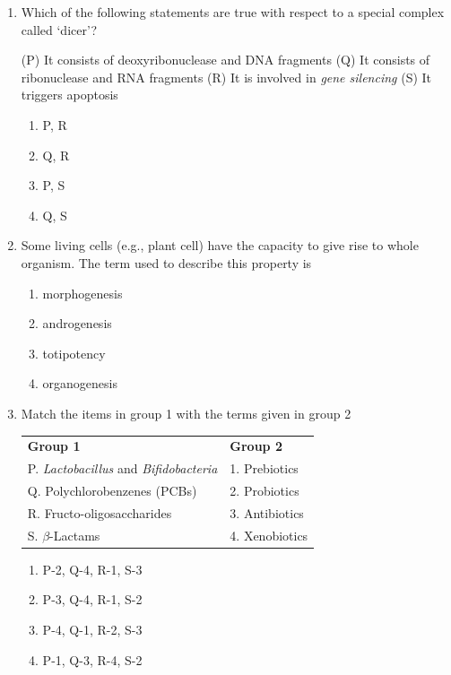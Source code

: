 \documentclass[journal,12pt,onecolumn]{IEEEtran}
\begin{document}
\begin{enumerate}
\item Which of the following statements are true with respect to a special complex called ‘dicer’?

(P) It consists of deoxyribonuclease and DNA fragments  
(Q) It consists of ribonuclease and RNA fragments  
(R) It is involved in \textit{gene silencing}  
(S) It triggers apoptosis  

\begin{multicols}{2}
\begin{enumerate}[label=(\Alph*)]
    \item P, R
    \item Q, R
    \item P, S
    \item Q, S
\end{enumerate}
\end{multicols}

\item Some living cells (e.g., plant cell) have the capacity to give rise to whole organism. The term used to describe this property is
\begin{multicols}{2}
\begin{enumerate}[label=(\Alph*)]
    \item morphogenesis
    \item androgenesis
    \item totipotency
    \item organogenesis
\end{enumerate}
\end{multicols}
\item Match the items in group 1 with the terms given in group 2

\begin{center}
\begin{tabular}{ll}
\textbf{Group 1} & \textbf{Group 2} \\
P. \textit{Lactobacillus} and \textit{Bifidobacteria} & 1. Prebiotics \\
Q. Polychlorobenzenes (PCBs) & 2. Probiotics \\
R. Fructo-oligosaccharides & 3. Antibiotics \\
S. $\beta$-Lactams & 4. Xenobiotics \\
\end{tabular}
\end{center}

\begin{multicols}{2}
\begin{enumerate}[label=(\Alph*)]
    \item P-2, Q-4, R-1, S-3
    \item P-3, Q-4, R-1, S-2
    \item P-4, Q-1, R-2, S-3
    \item P-1, Q-3, R-4, S-2
\end{enumerate}
\end{multicols}


\end{enumerate}
\end{document}
